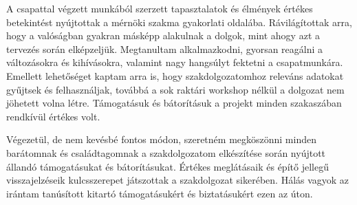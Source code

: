 A csapattal végzett munkából szerzett tapasztalatok és élmények értékes betekintést nyújtottak a mérnöki 
szakma gyakorlati oldalába. Rávilágítottak arra, hogy a valóságban gyakran másképp alakulnak a dolgok, mint ahogy azt a tervezés során elképzeljük. 
Megtanultam alkalmazkodni, gyorsan reagálni a változásokra és kihívásokra, valamint nagy hangsúlyt fektetni a csapatmunkára. 
Emellett lehetőséget kaptam arra is, hogy szakdolgozatomhoz releváns adatokat gyűjtsek és felhasználjak, 
továbbá a sok raktári workshop nélkül a dolgozat nem jöhetett volna létre. 
Támogatásuk és bátorításuk a projekt minden szakaszában rendkívül értékes volt.

Végezetül, de nem kevésbé fontos módon, szeretném megköszönni minden barátomnak és 
családtagomnak a szakdolgozatom elkészítése során nyújtott állandó támogatásukat és bátorításukat. 
Értékes meglátásaik és építő jellegű visszajelzéseik kulcsszerepet játszottak a szakdolgozat sikerében. 
Hálás vagyok az irántam tanúsított kitartó támogatásukért és biztatásukért ezen az úton.